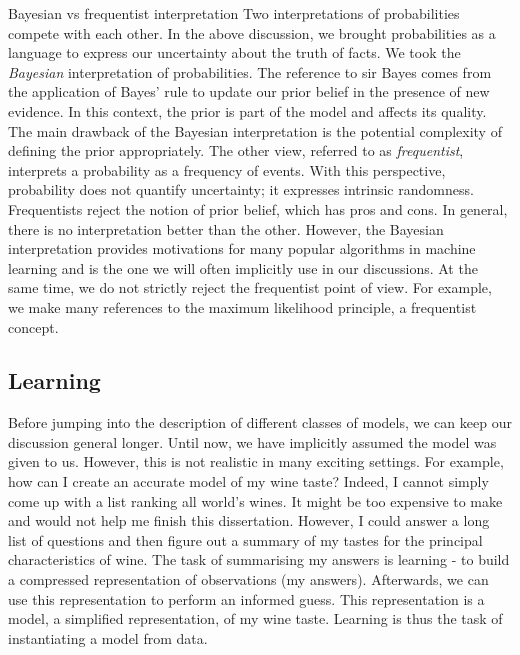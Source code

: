\begin{side_note}{Bayesian vs frequentist interpretation}
  Two interpretations of probabilities compete with each other. In the above discussion, we brought probabilities as a language to express our uncertainty about the truth of facts. We took the \textit{Bayesian} interpretation of probabilities. The reference to sir Bayes comes from the application of Bayes' rule to update our prior belief in the presence of new evidence. In this context, the prior is part of the model and affects its quality. The main drawback of the Bayesian interpretation is the potential complexity of defining the prior appropriately. The other view, referred to as \textit{frequentist}, interprets a probability as a frequency of events. With this perspective, probability does not quantify uncertainty; it expresses intrinsic randomness. Frequentists reject the notion of prior belief, which has pros and cons. In general, there is no interpretation better than the other. However, the Bayesian interpretation provides motivations for many popular algorithms in machine learning and is the one we will often implicitly use in our discussions. At the same time, we do not strictly reject the frequentist point of view. For example, we make many references to the maximum likelihood principle, a frequentist concept.
\end{side_note}
%

\subsection{Learning}
Before jumping into the description of different classes of models, we can keep our discussion general longer.
Until now, we have implicitly assumed the model was given to us. However, this is not realistic in many exciting settings. For example, how can I create an accurate model of my wine taste? Indeed, I cannot simply come up with a list ranking all world's wines. It might be too expensive to make and would not help me finish this dissertation. However, I could answer a long list of questions and then figure out a summary of my tastes for the principal characteristics of wine. The task of summarising my answers is learning - to build a compressed representation of observations (my answers). Afterwards, we can use this representation to perform an informed guess. This representation is a model, a simplified representation, of my wine taste. Learning is thus the task of instantiating a model from data.

